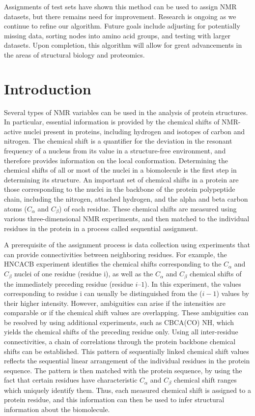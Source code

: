 \documentclass[12pt]{article}
\begin{document}
Assignments of test sets have shown this method can be used to assign NMR datasets, but there remains need for improvement. Research is ongoing as we continue to refine our algorithm. Future goals include adjusting for potentially missing data, sorting nodes into amino acid groups, and testing with larger datasets. Upon completion, this algorithm will allow for great advancements in the areas of structural biology and proteomics. 

\setcounter{page}{1}

\section{Introduction}
Several types of NMR variables can be used in the analysis of protein structures. In particular, essential information is provided by the chemical shifts of NMR-active nuclei present in proteins, including hydrogen and isotopes of carbon and nitrogen. The chemical shift is a quantifier for the deviation in the resonant frequency of a nucleus from its value in a structure-free environment, and therefore provides information on the local conformation. Determining the chemical shifts of all or most of the nuclei in a biomolecule is the first step in determining its structure. An important set of chemical shifts in a protein are those corresponding to the nuclei in the backbone of the protein polypeptide chain, including the nitrogen, attached hydrogen, and the alpha and beta carbon atoms ($C_\alpha$ and $C_{\beta}$) of each residue. These chemical shifts are measured using various three-dimensional NMR experiments, and then matched to the individual residues in the protein in a process called sequential assignment.

A prerequisite of the assignment process is data collection using experiments that can provide connectivities between neighboring residues. For example, the HNCACB experiment identifies the chemical shifts corresponding to the $C_\alpha$ and $C_{\beta}$ nuclei of one residue (residue i), as well as the $C_\alpha$ and $C_{\beta}$ chemical shifts of the immediately preceding residue (residue $i – 1$). In this experiment, the values corresponding to residue i can usually be distinguished from the ($i -1$) values by their higher intensity. However, ambiguities can arise if the intensities are comparable or if the chemical shift values are overlapping. These ambiguities can be resolved by using additional experiments, such as CBCA(CO) NH, which yields the chemical shifts of the preceding residue only. Using all inter-residue connectivities, a chain of correlations through the protein backbone chemical shifts can be established.  This pattern of sequentially linked chemical shift values reflects the sequential linear arrangement of the individual residues in the protein sequence. The pattern is then matched with the protein sequence, by using the fact that certain residues have characteristic $C_\alpha$ and $C_{\beta}$ chemical shift ranges which uniquely identify them. Thus, each measured chemical shift is assigned to a protein residue, and this information can then be used to infer structural information about the biomolecule.
\end{document}
